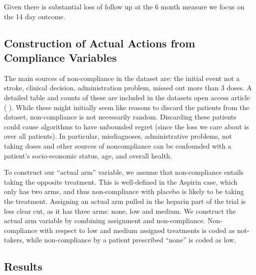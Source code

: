 Given there is substantial loss of follow up at the 6 month measure we focus on the 14 day outcome.


\subsection{Construction of Actual Actions from Compliance Variables}
The main sources of non-compliance in the dataset are: the initial event not a stroke, clinical decision, administration problem, missed out more than 3 doses. A detailed table and counts of these are included in the datasets open access article ( \cite{ist:11}). 
While these might initially seem like reasons to discard the patients from the dataset, non-compliance is not necessarily random. Discarding these patients could cause algorithms to have unbounded regret (since the loss we care about is over all patients). In particular, misdiagnoses, administrative problems, not taking doses and other sources of noncompliance can be confounded with a patient's socio-economic status, age, and overall health. 

To construct our ``actual arm'' variable, we assume that non-compliance entails taking the opposite treatment.
This is well-defined in the Aspirin case, which only has two arms, and thus non-compliance with placebo is likely to be taking the treatment.
Assigning an actual arm pulled in the heparin part of the trial is less clear cut, as it has three arms: none, low and medium. We construct the actual arm variable by combining assignment and non-compliance. Non-compliance with respect to low and medium assigned treatments is coded as  not-takers, while non-compliance by a patient prescribed ``none'' is coded as low.


\subsection{Results}


